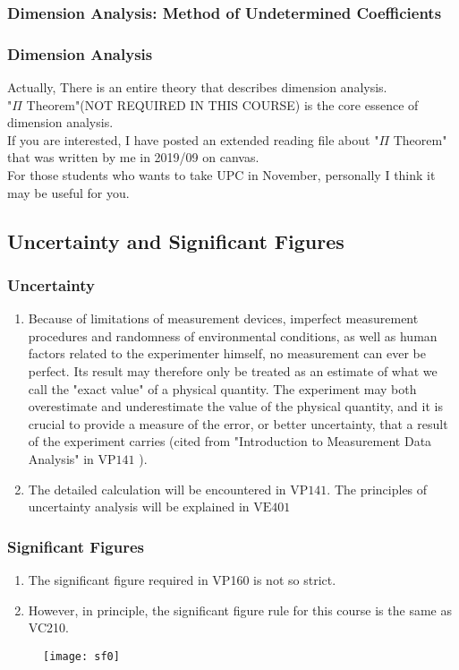 \documentclass{beamer}
\begin{document}
\begin{frame}
    \frametitle{Dimension Analysis: Method of Undetermined Coefficients}
    
\end{frame}
\begin{frame}
    \frametitle{Dimension Analysis}
    Actually, There is an entire theory that describes dimension analysis.\\ 
     "$\Pi$ Theorem"(NOT REQUIRED IN THIS COURSE) is the core essence 
    of dimension analysis. \\
    If you are interested, I have posted an extended reading file about "$\Pi$ Theorem" that was written by me in 2019/09 on canvas.\\ 
    For those students who wants to take UPC in November, personally I think it may be useful for you. 
    
\end{frame}
\subsection{Uncertainty and Significant Figures}
\begin{frame}
    \frametitle{Uncertainty}
    \begin{enumerate}
        \item Because of limitations of measurement devices, imperfect measurement procedures and randomness of environmental conditions, as well as human factors related to the experimenter himself, no measurement can ever be perfect. Its result may therefore only be treated as an estimate of what we call the "exact value" of a physical quantity. The experiment may both overestimate and underestimate the value of the physical quantity, and it is crucial to provide a measure of the error, or better uncertainty, that a result of the experiment carries (cited from "Introduction to Measurement Data Analysis" in $\mathrm{VP}141$ ).
        \item The detailed calculation will be encountered in VP$ 141 .$ The principles of uncertainty analysis will be explained in $\mathrm{VE} 401$
    \end{enumerate}
 
\end{frame}

\begin{frame}
    \frametitle{Significant Figures}
    \begin{enumerate}
        \item The significant figure required in VP160 is not so strict.
        \item However, in principle, the significant figure rule for this course is the same as VC210.
    \end{enumerate}
    \begin{figure}
    \texttt{[image: sf0]}
    \end{figure}
    

\end{frame}
\end{document}
